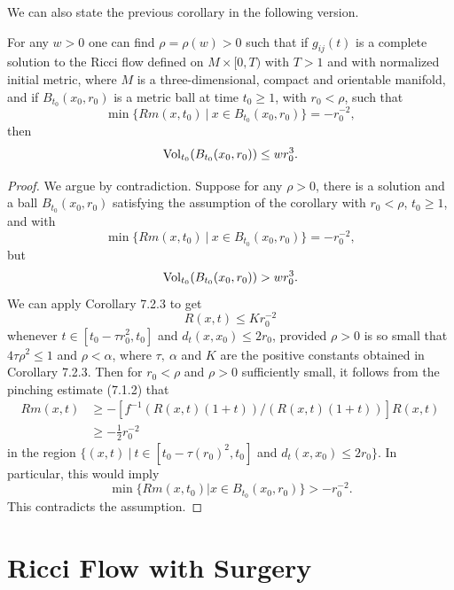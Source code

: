 We can also state the previous corollary in the following version.

\begin{corollary}
  \label{cor:cz-small-ball-pseudolocal-curvature-control}

For any $w>0$ one can find $\rho = \rho(w)>0$ such that if
$g_{ij}(t)$ is a complete solution to the Ricci flow defined on
$M\times[0,T)$ with $T>1$ and with normalized initial metric,
where $M$ is a three-dimensional, compact and orientable manifold,
and if $B_{t_0}(x_0,r_0)$ is a metric ball at time $t_0\geq1$,
with $r_0<\rho$, such that$$\min\{ Rm(x,t_0)\ |\ x\in
B_{t_0}(x_0,r_0)\}=-r_0^{-2},$$ then
$$
\operatorname{Vol}_{t_0}(B_{t_0}(x_0,r_0))\leq wr_0^3.
$$
\end{corollary}

\begin{proof}
We argue by contradiction. Suppose for any $\rho>0$, there is a
solution and a ball $B_{t_0}(x_0,r_0)$ satisfying the assumption
of the corollary with $r_0<\rho$, $t_0\geq1$, and with
$$
\min\{ Rm(x,t_0)\ |\ x\in B_{t_0}(x_0,r_0)\}=-r_0^{-2},
$$
but
$$
\operatorname{Vol}_{t_0}(B_{t_0}(x_0,r_0))>wr_0^3.
$$
We can apply Corollary 7.2.3 to get
$$
R(x,t)\leq Kr_0^{-2}
$$
whenever $t\in[t_0-\tau r_0^2,t_0]$ and $d_t(x,x_0)\leq2r_0$,
provided $\rho>0$ is so small that $4\tau\rho^2\leq1$ and
$\rho<\alpha$, where $\tau,\ \alpha$ and $K$ are the positive
constants obtained in Corollary 7.2.3. Then for $r_0<\rho$ and
$\rho>0$ sufficiently small, it follows from the pinching estimate
(7.1.2) that
\begin{displaymath}
\begin{split}
Rm(x,t)&  \geq -[f^{-1}(R(x,t)(1+t))/(R(x,t)(1+t))]R(x,t)\\[1mm]
           &  \geq-\frac{1}{2}r_0^{-2}
\end{split}
\end{displaymath}
in the region $\{(x,t)\ |\ t\in[t_0-\tau(r_0)^2,t_0]$ and
$d_t(x,x_0)\leq 2r_0\}$. In particular, this would imply
$$
\min\{ Rm(x,t_0)|x\in B_{t_0}(x_0,r_0)\}>-r_0^{-2}.
$$
This contradicts the assumption.
\end{proof}


\section{Ricci Flow with Surgery}

